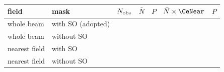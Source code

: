 \begin{tabular}{@{}llrrrrr@{}}
\hline
field & mask & $N_{\rm obs}$ & $\bar N$ & $P$ & $\bar N\times\CeNear$ & $P$ \\
\hline
whole beam & with SO (adopted) & \CeObs{} & \CeExp{} & \CeProbNull{} & \CeExpNear{} & \CeProbNear{} \\
whole beam & without SO & \MkNoSOObs{} & \MkNoSOExp{} & \MkNoSOProb{} & \CgExpWOSt{} & \CgProbWOSt{} \\
nearest field & with SO & \FrNarrowObs{} & \FrNarrowExp{} & \FrNarrowProb{} & \CgExpNSSt{} & \CgProbNSSt{} \\
nearest field & without SO & \CgObsNO{} & \CgExpNO{} & \CgMinProb{} & \CgExpNOSt{} & \CgProbNOSt{} \\
\hline
\end{tabular}
